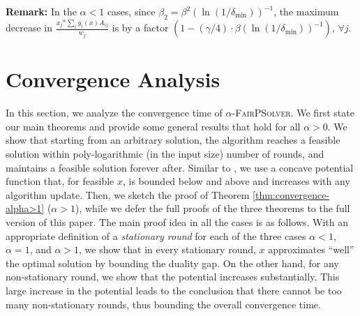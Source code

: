 \documentclass[11pt]{article}
\newif\iffullpaper
\begin{document}
\noindent\textbf{Remark:} In the $\alpha<1$ cases, since $\beta_2 = {\beta^2}({\ln({1}/{\delta_{\min}})})^{-1}$, the maximum decrease in $\frac{{x_j}^\alpha\sum_i y_i(x)A_{ij}}{w_j}$ is by a factor $(1-({\gamma}/{4})\cdot {\beta}({\ln(1/\delta_{\min})})^{-1})$, $\forall j$.

\section{Convergence Analysis}\label{section:convergence}
 
In this section, we analyze the convergence time of \textsc{$\alpha$-FairPSolver}. We first state our main theorems and provide some general results that hold for all $\alpha > 0$. We show that starting from an arbitrary solution, the algorithm reaches a feasible solution within poly-logarithmic (in the input size) number of rounds, and maintains a feasible solution forever after. Similar to \cite{AwerbuchKhandekar2009, dc-young2001sequential, kelly1998rate}, we use a concave potential function that, for feasible $x$, is bounded below and above and increases with any algorithm update. \iffullpaper Then, we analyze the convergence time separately for three cases: $\alpha<1$, $\alpha = 1$, and $\alpha>1$. 
With an appropriate definition of a \emph{stationary round} for each of the three cases, we show that in every stationary round, $x$ approximates ``well'' the optimal solution by bounding the duality gap. On the other hand, for any non-stationary round, we show that the potential increases substantially. This large increase in the potential then leads to the conclusion that there cannot be too many non-stationary rounds, thus bounding the overall convergence time. \else Then, we sketch the proof of Theorem \ref{thm:convergence-alpha>1} ($\alpha>1$), while we defer the full proofs of  the three theorems to the full version of this paper. The main proof idea in all the cases is as follows. With an appropriate definition of a \emph{stationary round} for each of the three cases $\alpha<1$, $\alpha = 1$, and $\alpha>1$, we show that in every stationary round, $x$ approximates ``well'' the optimal solution by bounding the duality gap. On the other hand, for any non-stationary round, we show that the potential increases substantially. This large increase in the potential leads to the conclusion that there cannot be too many non-stationary rounds, thus bounding the overall convergence time. \fi
\end{document}
